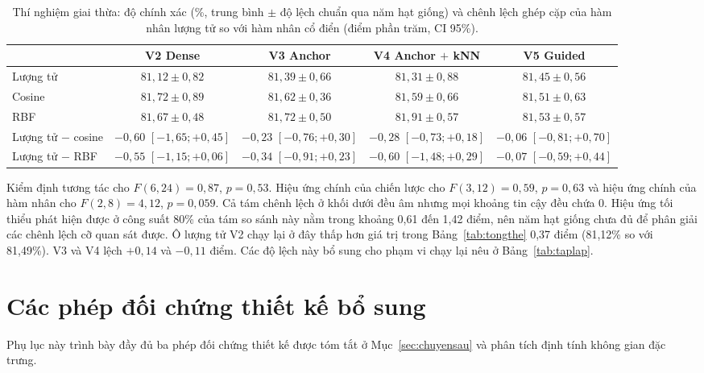 \begin{table}[!htbp]
\centering
\caption{Thí nghiệm giai thừa: độ chính xác (\%, trung bình $\pm$ độ lệch
chuẩn qua năm hạt giống) và chênh lệch ghép cặp của hàm nhân lượng tử so với
hàm nhân cổ điển (điểm phần trăm, CI 95\%).}
\label{tab:giaithua}
\footnotesize
\setlength{\tabcolsep}{4pt}
\begin{tabular}{lcccc}
\toprule
 & \textbf{V2 Dense} & \textbf{V3 Anchor} & \textbf{V4 Anchor $+$ kNN} & \textbf{V5 Guided} \\
\midrule
Lượng tử & $81{,}12 \pm 0{,}82$ & $81{,}39 \pm 0{,}66$ & $81{,}31 \pm 0{,}88$ & $81{,}45 \pm 0{,}56$ \\
Cosine & $81{,}72 \pm 0{,}89$ & $81{,}62 \pm 0{,}36$ & $81{,}59 \pm 0{,}66$ & $81{,}51 \pm 0{,}63$ \\
RBF & $81{,}67 \pm 0{,}48$ & $81{,}72 \pm 0{,}50$ & $81{,}91 \pm 0{,}57$ & $81{,}53 \pm 0{,}57$ \\
\midrule
Lượng tử $-$ cosine & $-0{,}60$ $[-1{,}65; +0{,}45]$ & $-0{,}23$ $[-0{,}76; +0{,}30]$ & $-0{,}28$ $[-0{,}73; +0{,}18]$ & $-0{,}06$ $[-0{,}81; +0{,}70]$ \\
Lượng tử $-$ RBF & $-0{,}55$ $[-1{,}15; +0{,}06]$ & $-0{,}34$ $[-0{,}91; +0{,}23]$ & $-0{,}60$ $[-1{,}48; +0{,}29]$ & $-0{,}07$ $[-0{,}59; +0{,}44]$ \\
\bottomrule
\end{tabular}
\end{table}

Kiểm định tương tác cho $F(6, 24) = 0{,}87$, $p = 0{,}53$. Hiệu ứng chính
của chiến lược cho $F(3, 12) = 0{,}59$, $p = 0{,}63$ và hiệu ứng chính của
hàm nhân cho $F(2, 8) = 4{,}12$, $p = 0{,}059$. Cả tám chênh lệch ở khối dưới
đều âm nhưng mọi khoảng tin cậy đều chứa 0. Hiệu ứng tối thiểu phát hiện
được ở công suất 80\% của tám so sánh này nằm trong khoảng 0,61 đến 1,42
điểm, nên năm hạt giống chưa đủ để phân giải các chênh lệch cỡ quan sát
được. Ô lượng tử V2 chạy lại ở đây thấp hơn giá trị trong
Bảng~\ref{tab:tongthe} 0,37 điểm (81,12\% so với 81,49\%). V3 và V4 lệch
$+0{,}14$ và $-0{,}11$ điểm. Các độ lệch này bổ sung cho phạm vi chạy lại
nêu ở Bảng~\ref{tab:taplap}.

\section{Các phép đối chứng thiết kế bổ sung}
\label{app:doichung}

Phụ lục này trình bày đầy đủ ba phép đối chứng thiết kế được tóm tắt ở
Mục~\ref{sec:chuyensau} và phân tích định tính không gian đặc trưng.

